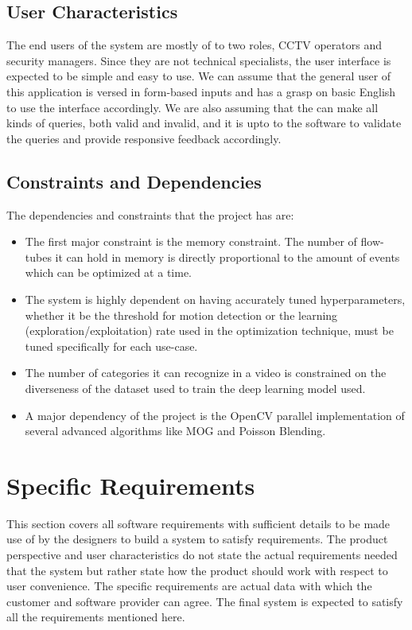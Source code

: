     \subsection{User Characteristics}
    The end users of the system are mostly of to two roles, CCTV operators and security managers. Since they are not technical specialists, the user interface is expected to be simple and easy to use. We can assume that the general user of this application is versed in form-based inputs and has a grasp on basic English to use the interface accordingly. We are also assuming that the can make all kinds of queries, both valid and invalid, and it is upto to the software to validate the queries and provide responsive feedback accordingly.

    \subsection{Constraints and Dependencies}
    The dependencies and constraints that the project has are:
    \begin{itemize}
        \item The first major constraint is the memory constraint. The number of flow-tubes it can hold in memory is directly proportional to the amount of events which can be optimized at a time.
        \item The system is highly dependent on having accurately tuned hyperparameters, whether it be the threshold for motion detection or the learning (exploration/exploitation) rate used in the optimization technique, must be tuned specifically for each use-case.
        \item The number of categories it can recognize in a video is constrained on the diverseness of the dataset used to train the deep learning model used.
        \item A major dependency of the project is the OpenCV parallel implementation of several advanced algorithms like MOG and Poisson Blending.
    \end{itemize}

\section{Specific Requirements}

This section covers all software requirements with sufficient details to be made use of by the designers to build a system to satisfy requirements. The product perspective and user characteristics do not state the actual requirements needed that the system but rather state how the product should work with respect to user convenience. The specific requirements are actual data with which the customer and software provider can agree. The final system is expected to satisfy all the requirements mentioned here.

